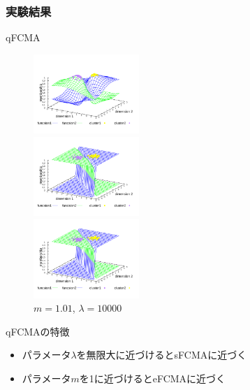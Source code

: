 \documentclass[13pt,dvipdfmx]{beamer}
\begin{document}
\begin{frame}\frametitle{実験結果}
  \begin{block}{qFCMA}
    \begin{figure}[htbp]
      \begin{minipage}{0.32\hsize}
        \begin{center}
          \includegraphics[width=40mm]{qFCMA-Em2-Lambda10.pdf}
        \end{center}
        \captionsetup{labelformat=empty,labelsep=none}
        \caption{$m=2.0$\;, \;$\lambda=10$}
        \label{fig:one}
      \end{minipage}
      \begin{minipage}{0.32\hsize}
        \begin{center}
          \includegraphics[width=40mm]{qFCMA-Em11-Lambda10.pdf}
        \end{center}
        \captionsetup{labelformat=empty,labelsep=none}
        \caption{$m=1.01$\;, \;$\lambda=10$}
        \label{fig:two}
      \end{minipage}
     \begin{minipage}{0.32\hsize}
      \begin{center}
       \includegraphics[width=40mm]{qFCMA-Em11-Lambda10000.pdf}
      \end{center}
      \captionsetup{labelformat=empty,labelsep=none}
      \caption{$m=1.01$\;, \;$\lambda=10000$}
      \label{fig:two}
     \end{minipage}
    \end{figure}
  \end{block}
  \begin{block}{qFCMAの特徴}
    \begin{itemize}
      \item パラメータ$\lambda$を無限大に近づけるとsFCMAに近づく
      \item パラメータ$m$を1に近づけるとeFCMAに近づく
    \end{itemize}
  \end{block}
\end{frame}
\end{document}
